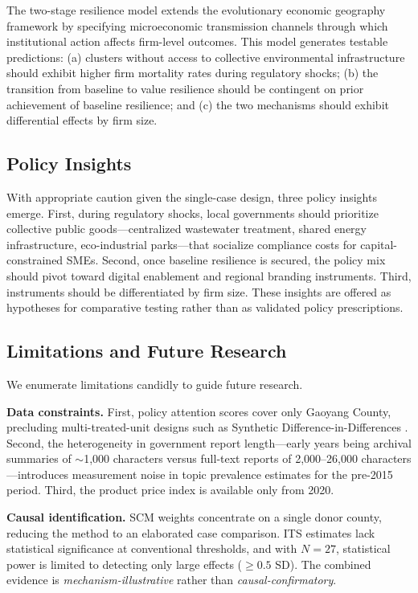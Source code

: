 \documentclass[a4paper, twoside, final]{article}
\begin{document}
The two-stage resilience model extends the evolutionary economic geography framework \citep{Boschma2015, Martin2015} by specifying microeconomic transmission channels through which institutional action affects firm-level outcomes. This model generates testable predictions: (a) clusters without access to collective environmental infrastructure should exhibit higher firm mortality rates during regulatory shocks; (b) the transition from baseline to value resilience should be contingent on prior achievement of baseline resilience; and (c) the two mechanisms should exhibit differential effects by firm size.

\subsection{Policy Insights}
With appropriate caution given the single-case design, three policy insights emerge. First, during regulatory shocks, local governments should prioritize collective public goods---centralized wastewater treatment, shared energy infrastructure, eco-industrial parks---that socialize compliance costs for capital-constrained SMEs. Second, once baseline resilience is secured, the policy mix should pivot toward digital enablement and regional branding instruments. Third, instruments should be differentiated by firm size. These insights are offered as hypotheses for comparative testing rather than as validated policy prescriptions.

\subsection{Limitations and Future Research}
We enumerate limitations candidly to guide future research.

\textbf{Data constraints.} First, policy attention scores cover only Gaoyang County, precluding multi-treated-unit designs such as Synthetic Difference-in-Differences \citep{Arkhangelsky2021}. Second, the heterogeneity in government report length---early years being archival summaries of $\sim$1,000 characters versus full-text reports of 2,000--26,000 characters---introduces measurement noise in topic prevalence estimates for the pre-2015 period. Third, the product price index is available only from 2020.

\textbf{Causal identification.} SCM weights concentrate on a single donor county, reducing the method to an elaborated case comparison. ITS estimates lack statistical significance at conventional thresholds, and with $N=27$, statistical power is limited to detecting only large effects ($\geq 0.5$ SD). The combined evidence is \emph{mechanism-illustrative} rather than \emph{causal-confirmatory}.
\end{document}
